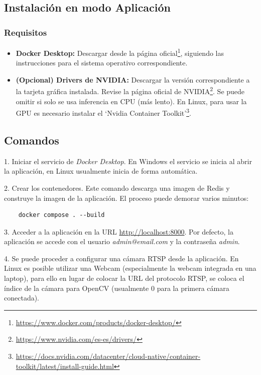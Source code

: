 \documentclass[11pt,a4paper]{article}
\begin{document}
\subsection{Instalación en modo Aplicación}

\subsubsection{Requisitos}

\begin{itemize}
    \item \textbf{Docker Desktop:} Descargar desde la página oficial\footnote{\url{https://www.docker.com/products/docker-desktop/}}, siguiendo las instrucciones para el sistema operativo correspondiente.
    \item \textbf{(Opcional) Drivers de NVIDIA:} Descargar la versión correspondiente a la tarjeta gráfica instalada. Revise la página oficial de NVIDIA\footnote{\url{https://www.nvidia.com/es-es/drivers/}}. Se puede omitir si solo se usa inferencia en CPU (más lento). En Linux, para usar la GPU es necesario instalar el `Nvidia Container Toolkit'\footnote{\url{https://docs.nvidia.com/datacenter/cloud-native/container-toolkit/latest/install-guide.html}}.
\end{itemize}

\subsection{Comandos}

1. Iniciar el servicio de \textit{Docker Desktop}. En Windows el servicio se inicia al abrir la aplicación, en Linux usualmente inicia de forma automática.

2. Crear los contenedores. Este comando descarga una imagen de Redis y construye la imagen de la aplicación. El proceso puede demorar varios minutos:

\begin{verbatim}
    docker compose . --build
\end{verbatim}

3. Acceder a la aplicación en la URL \url{http://localhost:8000}. Por defecto, la aplicación se accede con el usuario \textit{admin@email.com} y la contraseña \textit{admin}.

4. Se puede proceder a configurar una cámara RTSP desde la aplicación. En Linux es posible utilizar una Webcam (especialmente la webcam integrada en una laptop), para ello en lugar de colocar la URL del protocolo RTSP, se coloca el índice de la cámara para OpenCV (usualmente 0 para la primera cámara conectada).
\end{document}

